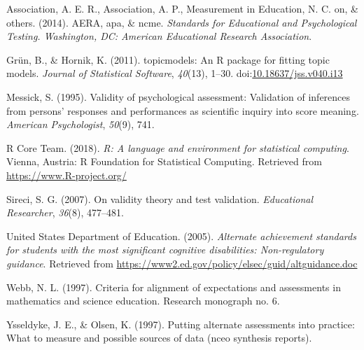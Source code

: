 \documentclass[doc]{apa6}
\theoremstyle{definition}
\theoremstyle{definition}
\theoremstyle{definition}
\theoremstyle{remark}
\begin{document}
\hypertarget{refs}{}
\leavevmode\hypertarget{ref-standards14}{}%
Association, A. E. R., Association, A. P., Measurement in Education, N.
C. on, \& others. (2014). AERA, apa, \& ncme. \emph{Standards for
Educational and Psychological Testing. Washington, DC: American
Educational Research Association}.

\leavevmode\hypertarget{ref-grun11}{}%
Grün, B., \& Hornik, K. (2011). topicmodels: An R package for fitting
topic models. \emph{Journal of Statistical Software}, \emph{40}(13),
1--30.
doi:\href{https://doi.org/10.18637/jss.v040.i13}{10.18637/jss.v040.i13}

\leavevmode\hypertarget{ref-messick95}{}%
Messick, S. (1995). Validity of psychological assessment: Validation of
inferences from persons' responses and performances as scientific
inquiry into score meaning. \emph{American Psychologist}, \emph{50}(9),
741.

\leavevmode\hypertarget{ref-r}{}%
R Core Team. (2018). \emph{R: A language and environment for statistical
computing}. Vienna, Austria: R Foundation for Statistical Computing.
Retrieved from \url{https://www.R-project.org/}

\leavevmode\hypertarget{ref-sireci07}{}%
Sireci, S. G. (2007). On validity theory and test validation.
\emph{Educational Researcher}, \emph{36}(8), 477--481.

\leavevmode\hypertarget{ref-usdoe05}{}%
United States Department of Education. (2005). \emph{Alternate
achievement standards for students with the most significant cognitive
disabilities: Non-regulatory guidance}. Retrieved from
\url{https://www2.ed.gov/policy/elsec/guid/altguidance.doc}

\leavevmode\hypertarget{ref-webb97}{}%
Webb, N. L. (1997). Criteria for alignment of expectations and
assessments in mathematics and science education. Research monograph no.
6.

\leavevmode\hypertarget{ref-ysseldyke97}{}%
Ysseldyke, J. E., \& Olsen, K. (1997). Putting alternate assessments
into practice: What to measure and possible sources of data (nceo
synthesis reports).
\end{document}
